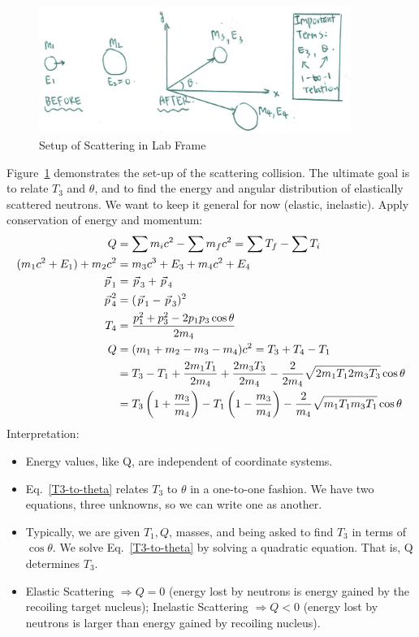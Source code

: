 \documentclass{school-22.101-notes}
\begin{document}
\begin{figure}[ht]
    \centering
    \includegraphics[width=4in]{images/ni/setup-lab.png}
    \caption{Setup of Scattering in Lab Frame\label{setup-lab}}
\end{figure}
Figure~\ref{setup-lab} demonstrates the set-up of the scattering collision. The ultimate goal is to relate $T_3$ and $\theta$, and to find the energy and angular distribution of elastically scattered neutrons. 
We want to keep it general for now (elastic, inelastic). Apply conservation of energy and momentum: 
\begin{align}
Q &= \displaystyle\sum m_i c^2 - \displaystyle\sum m_f c^2 = \displaystyle\sum T_f - \displaystyle\sum T_i \\
(m_1 c^2 + E_1 ) + m_2 c^2 &= m_3 c^3 + E_3 + m_4 c^2 + E_4 \\
\left.\vec{p}\right._1 &= \left.\vec{p}\right._3 + \left.\vec{p}\right._4 \\
\left.\vec{p}\right._4^2 &= (\left.\vec{p}\right._1 - \left.\vec{p}\right._3)^2 \\
T_4 &= \frac{p_1^2 + p_3^2 - 2 p_1 p_3 \cos \theta }{2 m_4} \\
Q &= (m_1 + m_2 - m_3 - m_4) c^2 = T_3 + T_4 - T_1 \\
&= T_3  - T_1 + \frac{2 m_1 T_1}{2 m_4} + \frac{2 m_3 T_3}{2 m_4} - \frac{2}{2m_4} \sqrt{2 m_1 T_1 2 m_3 T_3} \cos \theta \\
&= T_3 \left( 1 + \frac{m_3}{m_4} \right) - T_1 \left( 1 - \frac{m_3}{m_4} \right) - \frac{2}{m_4} \sqrt{m_1 T_1 m_3 T_1} \cos \theta \label{T3-to-theta}
\end{align}
Interpretation: 
\begin{itemize}
\item Energy values, like Q, are independent of coordinate systems. 
\item Eq.~\ref{T3-to-theta} relates $T_3$ to $\theta$ in a one-to-one fashion. We have two equations, three unknowns, so we can write one as another.
\item Typically, we are given $T_1, Q$, masses, and being asked to find $T_3$ in terms of $\cos \theta$. We solve Eq.~\ref{T3-to-theta} by solving a quadratic equation. That is, Q determines $T_3$.
\item Elastic Scattering $\Rightarrow Q=0$ (energy lost by neutrons is energy gained by the recoiling target nucleus); Inelastic Scattering $\Rightarrow Q < 0$ (energy lost by neutrons is larger than energy gained by recoiling nucleus). 
\end{itemize}
\end{document}
